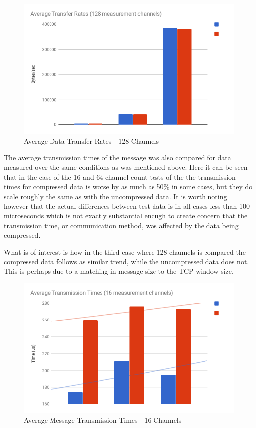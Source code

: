       \begin{figure}[H]
        \includegraphics[width=\textwidth]{figures/testing/compression/128mps-avg-tx}
        \caption{Average Data Transfer Rates - 128 Channels}
        \label{fig:zlib-tests-tx-128}
      \end{figure}

      The average transmission times of the message was also compared for data
      measured over the same conditions as was mentioned above. Here it can be
      seen that in the case of the 16 and 64 channel count tests of the the
      transmission times for compressed data is worse by as much as 50\% in
      some cases, but they do scale roughly the same as with the uncompressed
      data. It is worth noting however that the actual differences between test
      data is in all cases less than 100 microseconds which is not exactly
      substantial enough to create concern that the transmission time, or
      communication method, was affected by the data being compressed.

      What is of interest is how in the third case where 128 channels is
      compared the compressed data follows as similar trend, while the
      uncompressed data does not. This is perhaps due to a matching in message
      size to the TCP window size.

      \begin{figure}[H]
        \includegraphics[width=\textwidth]{figures/testing/compression/16mps-avg-msg-time}
        \caption{Average Message Transmission Times - 16 Channels}
        \label{fig:zlib-tests-time-16}
      \end{figure}

